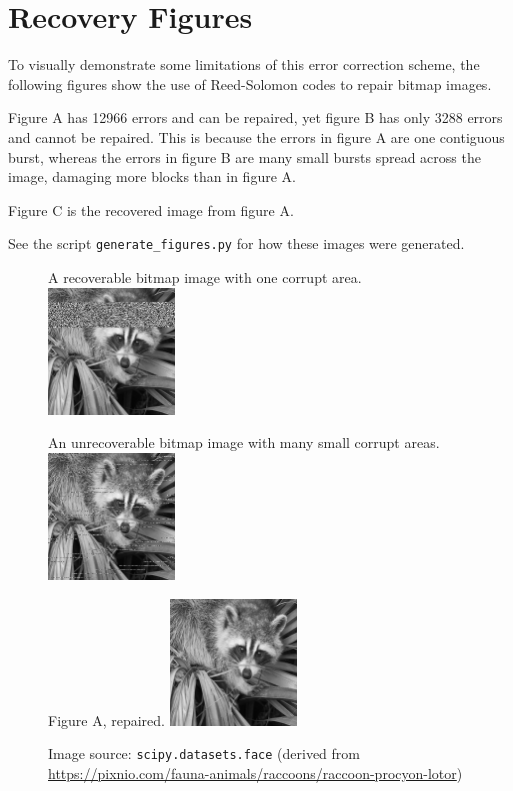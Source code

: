 \appendix
\appendixpage
\addappheadtotoc

\section{Recovery Figures}

To visually demonstrate some limitations of this error correction scheme, the following figures show the use of Reed-Solomon codes to repair bitmap images.

Figure A has 12966 errors and can be repaired, yet figure B has only 3288 errors and cannot be repaired.
This is because the errors in figure A are one contiguous burst, whereas the errors in figure B are many small bursts spread across the image, damaging more blocks than in figure A.

Figure C is the recovered image from figure A.

See the script \texttt{generate\_figures.py} for how these images were generated.

\begin{figure}[H]
    \centering
    \begin{subcaptionbox}{A recoverable bitmap image with one corrupt area.}
        {\includegraphics[width=0.3\textwidth]{face_2.png}}
    \end{subcaptionbox}
    \hfill
    \begin{subcaptionbox}{An unrecoverable bitmap image with many small corrupt areas.}
        {\includegraphics[width=0.3\textwidth]{face_3.png}}
    \end{subcaptionbox}
    \hfill
    \begin{subcaptionbox}{Figure A, repaired.}
        {\includegraphics[width=0.3\textwidth]{face_2_repaired.png}}
    \end{subcaptionbox}
    
    \caption{Image source: \texttt{scipy.datasets.face} (derived from \url{https://pixnio.com/fauna-animals/raccoons/raccoon-procyon-lotor})}
\end{figure}
